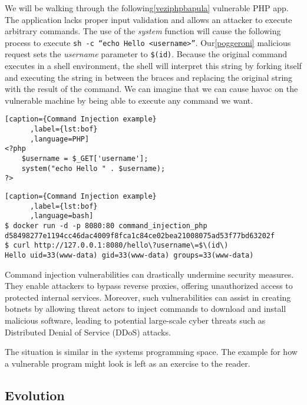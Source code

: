 \documentclass{article}
\begin{document}
We will be walking through the following\ref{veziphpbapula} vulnerable PHP app.
The application lacks proper input validation and allows an attacker to execute
arbitrary commands. The use of the \emph{system} function will cause the following
process to execute \texttt{sh -c ``echo Hello <username>''}. Our\ref{poggeroni}
malicious request sets the \emph{username} parameter to \verb|$(id)|. Because
the original command executes in a shell environment, the shell will interpret
this string by forking itself and executing the string in between the braces and
replacing the original string with the result of the command. We can imagine that
we can cause havoc on the vulnerable machine by being able to execute any command
we want.

\begin{minipage}{\linewidth}
\begin{lstlisting}[caption={Command Injection example}
      ,label={lst:bof}
      ,language=PHP]
<?php
    $username = $_GET['username'];
    system("echo Hello " . $username);
?>
\end{lstlisting}
\end{minipage}

\begin{lstlisting}[caption={Command Injection example}
      ,label={lst:bof}
      ,language=bash]
$ docker run -d -p 8080:80 command_injection_php
d58498277e1194cc46dac4009f8fca1c84ce02bea21008075ad53f77bd63202f
$ curl http://127.0.0.1:8080/hello\?username\=$\(id\)
Hello uid=33(www-data) gid=33(www-data) groups=33(www-data)
\end{lstlisting}

Command injection vulnerabilities can drastically undermine security measures. They enable attackers to bypass reverse proxies, offering unauthorized access to protected internal services. Moreover, such vulnerabilities can assist in creating botnets by allowing threat actors to inject commands to download and install malicious software, leading to potential large-scale cyber threats such as Distributed Denial of Service (DDoS) attacks.

The situation is similar in the systems programming space. The example for how 
a vulnerable program might look is left as an exercise to the reader.
\subsection{Evolution}
\begin{comment}
  ret2libc
  Mention the lack of mitigation
  Rise of heap based exploits due to browsers and JS
  Research some linux&windows kernel exploits
\end{comment}
\end{document}
